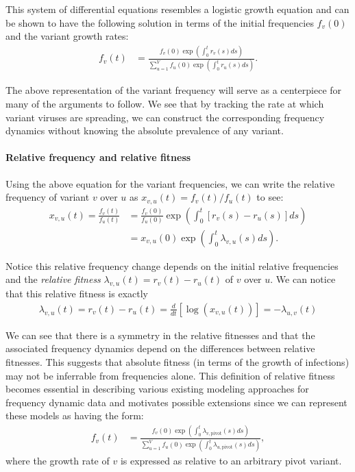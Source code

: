 \documentclass[12pt,oneside,letterpaper]{article}
\begin{document}
This system of differential equations resembles a logistic growth equation and can be shown to have the following solution in terms of the initial frequencies $f_{v}(0)$ and the variant growth rates:
\begin{align}
    f_{v}(t) &= \frac{ f_{v}(0) \exp( \int_{0}^{t} r_{v}(s) ds)}{\sum_{u=1}^{V}  f_{u}(0) \exp( \int_{0}^{t} r_{u}(s) ds)}.
\end{align}

The above representation of the variant frequency will serve as a centerpiece for many of the arguments to follow.
We see that by tracking the rate at which variant viruses are spreading, we can construct the corresponding frequency dynamics without knowing the absolute prevalence of any variant.

\paragraph{Relative frequency and relative fitness}%

Using the above equation for the variant frequencies, we can write the relative frequency of variant $v$ over $u$ as $x_{v,u}(t) = f_{v}(t) / f_{u}(t)$ to see:
\begin{align*}
    x_{v, u}(t) = \frac{f_{v}(t)}{f_{u}(t)} &= \frac{f_{v}(0)}{f_{u}(0)} \exp \left( \int_{0}^{t} [r_{v}(s) - r_{u}(s)] ds \right)\\
                                            &=x_{v,u}(0)\exp \left( \int_{0}^{t} \lambda_{v,u}(s) ds \right).
\end{align*}

Notice this relative frequency change depends on the initial relative frequencies and the \emph{relative fitness} $\lambda_{v,u}(t) = r_{v}(t) - r_{u}(t)$ of $v$ over $u$.
We can notice that this relative fitness is exactly
\begin{align}
\lambda_{v, u}(t) = r_{v}(t) - r_{u}(t) = \frac{d }{d t} \left[\log \left( x_{v,u}(t) \right) \right] = - \lambda_{u,v}(t)
\end{align}

We can see that there is a symmetry in the relative fitnesses and that the associated frequency dynamics depend on the differences between relative fitnesses.
This suggests that absolute fitness (in terms of the growth of infections) may not be inferrable from frequencies alone.
This definition of relative fitness becomes essential in describing various existing modeling approaches for frequency dynamic data and motivates possible extensions since we can represent these models as having the form:
\begin{align}
    f_{v}(t) &= \frac{ f_{v}(0) \exp( \int_{0}^{t} \lambda_{v, \text{pivot}}(s) ds)}{\sum_{u=1}^{V}  f_{u}(0) \exp( \int_{0}^{t} \lambda_{u, \text{pivot}}(s) ds)},
\end{align}
where the growth rate of $v$ is expressed as relative to an arbitrary pivot variant.
\end{document}

